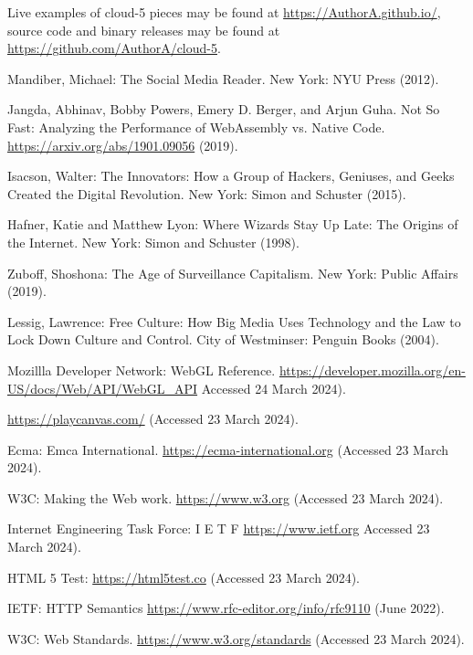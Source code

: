 \documentclass[runningheads,a4paper]{llncs}
\begin{document}
\noindent Live examples of cloud-5 pieces may be found at \url{https://AuthorA.github.io/}, source code and binary releases may be found at \url{https://github.com/AuthorA/cloud-5}.

\begin{thebibliography}{4}

 Mandiber, Michael: The Social Media Reader. New York: NYU Press (2012).

 Jangda, Abhinav, Bobby Powers, Emery D. Berger, and Arjun Guha. Not So Fast: Analyzing the Performance of WebAssembly vs. Native Code. \url{https://arxiv.org/abs/1901.09056} (2019).

 Isacson, Walter: The Innovators: How a Group of Hackers, Geniuses, and Geeks Created the Digital Revolution. New York: Simon and Schuster (2015).

 Hafner, Katie and Matthew Lyon: Where Wizards Stay Up Late: The Origins of the Internet. New York: Simon and Schuster (1998).

 Zuboff, Shoshona: The Age of Surveillance Capitalism. New York: Public Affairs (2019).

 Lessig, Lawrence: Free Culture: How Big Media Uses Technology and the Law to Lock Down Culture and Control. City of Westminser: Penguin Books (2004).

 Mozillla Developer Network: WebGL Reference. \url{https://developer.mozilla.org/en-US/docs/Web/API/WebGL_API} Accessed 24 March 2024).

 \url{https://playcanvas.com/} (Accessed 23 March 2024).

 Ecma: Emca International. \url{https://ecma-international.org} (Accessed 23 March 2024).

 W3C: Making the Web work. \url{https://www.w3.org} (Accessed 23 March 2024).

 Internet Engineering Task Force: I E T F \url{https://www.ietf.org} Accessed 23 March 2024).

 HTML 5 Test: \url{https://html5test.co} (Accessed 23 March 2024).

 IETF: HTTP Semantics \url{https://www.rfc-editor.org/info/rfc9110} (June 2022).

 W3C: Web Standards. \url{https://www.w3.org/standards} (Accessed 23 March 2024).


\end{thebibliography}
\end{document}
